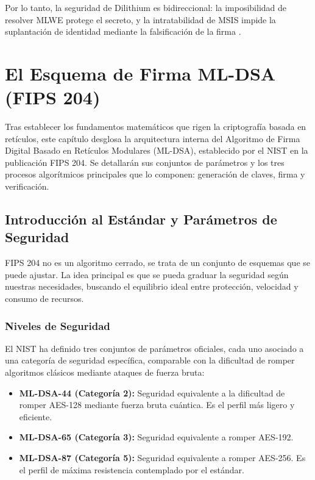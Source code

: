 \documentclass[11pt, a4paper]{report}
\theoremstyle{definition}
\begin{document}
Por lo tanto, la seguridad de Dilithium es bidireccional: la imposibilidad de resolver MLWE protege el secreto, y la intratabilidad de MSIS impide la suplantación de identidad mediante la falsificación de la firma \cite{peikert2016decade}.


\chapter{El Esquema de Firma ML-DSA (FIPS 204)}

Tras establecer los fundamentos matemáticos que rigen la criptografía basada en retículos, este capítulo desglosa la arquitectura interna del Algoritmo de Firma Digital Basado en Retículos Modulares (ML-DSA), establecido por el NIST en la publicación FIPS 204. Se detallarán sus conjuntos de parámetros y los tres procesos algorítmicos principales que lo componen: generación de claves, firma y verificación.

\section{Introducción al Estándar y Parámetros de Seguridad}

FIPS 204 no es un algoritmo cerrado, se trata de un conjunto de esquemas que se puede ajustar. La idea principal es que se pueda graduar la seguridad según nuestras necesidades, buscando el equilibrio ideal entre protección, velocidad y consumo de recursos.

\subsection{Niveles de Seguridad}

El NIST ha definido tres conjuntos de parámetros oficiales, cada uno asociado a una categoría de seguridad específica, comparable con la dificultad de romper algoritmos clásicos mediante ataques de fuerza bruta:

\begin{itemize}
    \item \textbf{ML-DSA-44 (Categoría 2):} Seguridad equivalente a la dificultad de romper AES-128 mediante fuerza bruta cuántica. Es el perfil más ligero y eficiente.
    \item \textbf{ML-DSA-65 (Categoría 3):} Seguridad equivalente a romper AES-192.
    \item \textbf{ML-DSA-87 (Categoría 5):} Seguridad equivalente a romper AES-256. Es el perfil de máxima resistencia contemplado por el estándar.
\end{itemize}
\end{document}
